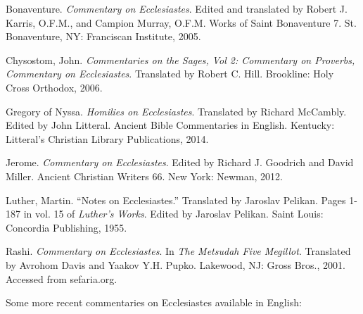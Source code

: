 \documentclass[titlepage]{article}
\begin{document}
\begingroup
\renewcommand{\section}[2]{}%
\begin{thebibliography}{99}

 Bonaventure. \emph{Commentary on Ecclesiastes}. Edited and translated by Robert J. Karris, O.F.M., and Campion Murray, O.F.M. Works of Saint Bonaventure 7. St. Bonaventure, NY: Franciscan Institute, 2005.

 Chysostom, John. \emph{Commentaries on the Sages, Vol 2: Commentary on Proverbs, Commentary on Ecclesiastes}. Translated by Robert C. Hill. Brookline: Holy Cross Orthodox, 2006.

 Gregory of Nyssa. \emph{Homilies on Ecclesiastes}. Translated by Richard McCambly. Edited by John Litteral. Ancient Bible Commentaries in English. Kentucky: Litteral’s Christian Library Publications, 2014.

 Jerome. \emph{Commentary on Ecclesiastes}. Edited by Richard J. Goodrich and David Miller. Ancient Christian Writers 66. New York: Newman, 2012.

 Luther, Martin. “Notes on Ecclesiastes.” Translated by Jaroslav Pelikan. Pages 1-187 in vol. 15 of \emph{Luther’s Works}. Edited by Jaroslav Pelikan. Saint Louis: Concordia Publishing, 1955.

 Rashi. \emph{Commentary on Ecclesiastes}. In \emph{The Metsudah Five Megillot}. Translated by Avrohom Davis and Yaakov Y.H. Pupko. Lakewood, NJ: Gross Bros., 2001. Accessed from sefaria.org.

\end{thebibliography}
\endgroup

\noindent Some more recent commentaries on Ecclesiastes available in English:
\end{document}
